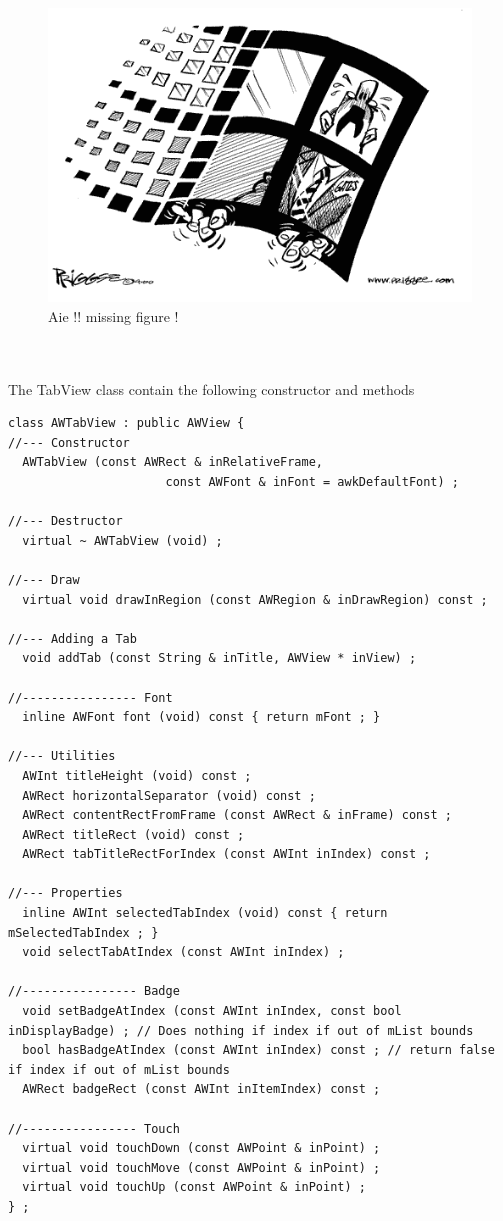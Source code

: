 \documentclass[a4paper,11pt]{extarticle}
\begin{document}
\begin{figure}[htbp]
   \centering
   \includegraphics[scale=0.55]{AWFig.png} 
   \caption{Aie !! missing figure !}
   \label{fig:14 }
\end{figure}

~\\

~\\ The TabView class contain the following constructor and methods

\begin{lstlisting}[language=Arduinonl]
class AWTabView : public AWView {
//--- Constructor
  AWTabView (const AWRect & inRelativeFrame,
                      const AWFont & inFont = awkDefaultFont) ;

//--- Destructor
  virtual ~ AWTabView (void) ;

//--- Draw
  virtual void drawInRegion (const AWRegion & inDrawRegion) const ;

//--- Adding a Tab
  void addTab (const String & inTitle, AWView * inView) ;

//---------------- Font
  inline AWFont font (void) const { return mFont ; }

//--- Utilities
  AWInt titleHeight (void) const ;
  AWRect horizontalSeparator (void) const ;
  AWRect contentRectFromFrame (const AWRect & inFrame) const ;
  AWRect titleRect (void) const ;
  AWRect tabTitleRectForIndex (const AWInt inIndex) const ;

//--- Properties
  inline AWInt selectedTabIndex (void) const { return mSelectedTabIndex ; }
  void selectTabAtIndex (const AWInt inIndex) ;

//---------------- Badge
  void setBadgeAtIndex (const AWInt inIndex, const bool inDisplayBadge) ; // Does nothing if index if out of mList bounds
  bool hasBadgeAtIndex (const AWInt inIndex) const ; // return false if index if out of mList bounds
  AWRect badgeRect (const AWInt inItemIndex) const ;

//---------------- Touch
  virtual void touchDown (const AWPoint & inPoint) ;
  virtual void touchMove (const AWPoint & inPoint) ;
  virtual void touchUp (const AWPoint & inPoint) ;
} ;
\end{lstlisting}
\end{document}
